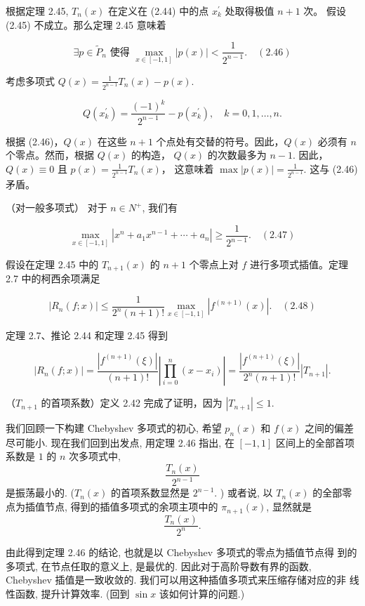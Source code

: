 \documentclass[a4paper]{ctexart}
\begin{document}
{ 根据定理 2.45, \(T_{n}(x)\) 在定义在 (2.44) 中的点 \(x_{k}^{\prime}\) 处取得极值 \(n+1\) 次。
假设 (2.45) 不成立。那么定理 2.45 意味着

\[ \exists p \in \tilde{P}_n \text{ 使得 } \max_{x \in [-1,1]} |p(x)| < \frac{1}{2^{n-1}}. \quad (2.46) \]

考虑多项式 \(Q(x) = \frac{1}{2^{n-1}} T_n(x) - p(x)\).

\[ Q\left(x_k^{\prime}\right) = \frac{(-1)^k}{2^{n-1}} - p\left(x_k^{\prime}\right), \quad k = 0,1,\ldots, n. \]

根据 (2.46)，\(Q(x)\) 在这些 \(n+1\) 个点处有交替的符号。因此，\(Q(x)\) 必须有 \(n\) 个零点。然而，根据 \(Q(x)\) 的构造，
\(Q(x)\) 的次数最多为 \(n-1\). 因此，\(Q(x) \equiv 0\) 且 \(p(x) = \frac{1}{2^{n-1}} T_{n}(x)\)，
这意味着 \(\max|p(x)| = \frac{1}{2^{n-1}}\). 这与 (2.46) 矛盾。

（对一般多项式） 对于 \(n \in N^{+}\), 我们有

\[ \max_{x \in [-1,1]} \left| x^{n} + a_{1} x^{n-1} + \cdots + a_{n} \right| \geq \frac{1}{2^{n-1}}. \quad (2.47) \]

 假设在定理 2.45 中的 \(T_{n+1}(x)\) 的 \(n+1\) 个零点上对 \(f\) 进行多项式插值。定理 2.7 中的柯西余项满足

\[ \left|R_n(f; x)\right| \leq \frac{1}{2^n(n+1)!} \max_{x \in [-1,1]} \left| f^{(n+1)}(x) \right|. \quad (2.48) \]

 定理 2.7、推论 2.44 和定理 2.45 得到

\[ \left|R_n(f; x)\right| = \frac{\left|f^{(n+1)}(\xi)\right|}{(n+1)!} \left| \prod_{i=0}^n (x - x_i) \right| 
= \frac{\left|f^{(n+1)}(\xi)\right|}{2^n(n+1)!} \left| T_{n+1} \right|. \]

（$T_{n + 1}$ 的首项系数）定义 2.42 完成了证明，因为 \(\left| T_{n+1} \right| \leq 1\).


我们回顾一下构建 Chebyshev 多项式的初心, 希望 $p_n(x)$ 和 $f(x)$ 之间的偏差尽可能小. 
现在我们回到出发点, 用定理 2.46 指出, 在 $[-1, 1]$ 区间上的全部首项系数是 $1$ 的 $n$ 次多项式中,
$$
\frac{T_n(x)}{2^{n - 1}}
$$
是振荡最小的. ($T_n(x)$ 的首项系数显然是 $2^{n - 1}$. )
或者说, 以 $T_n(x)$ 的全部零点为插值节点, 得到的插值多项式的余项主项中的
$\pi_{n + 1}(x)$, 显然就是
$$
\frac{T_n(x)}{2^n}.
$$

由此得到定理 2.46 的结论, 也就是以 Chebyshev 多项式的零点为插值节点得
到的多项式, 在节点任取的意义上, 是最优的. 因此对于高阶导数有界的函数,
Chebyshev 插值是一致收敛的. 我们可以用这种插值多项式来压缩存储对应的非
线性函数, 提升计算效率. (回到 $\sin x$ 该如何计算的问题.)

}
\end{document}
